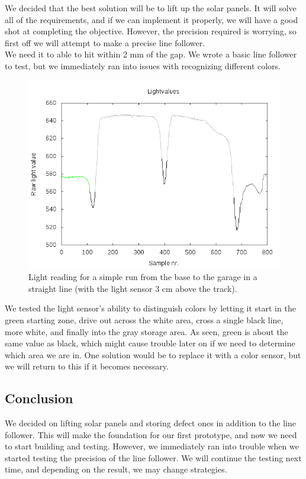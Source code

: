 We decided that the best solution will be to lift up the solar panels.
It will solve all of the requirements, and if we can implement it
properly, we will have a good shot at completing the objective. However,
the precision required is worrying, so first off we will attempt to
make a precise line follower.\\We need it to able to hit within 2 mm of
the gap. We wrote a basic line follower to test, but we immediately ran
into issues with recognizing different colors.\\
\begin{figure}[hpt]
  \centering
  \includegraphics[scale=0.5]{../experiments/1prototype/results/gnuplot/GridAccuracy3cm_color.png}
  \caption{Light reading for a simple run from the base to the garage in a straight line (with the light sensor 3 cm above the track).}
\end{figure}
We tested the light sensor's ability to distinguish colors by letting it
start in the green starting zone, drive out across the white area,
cross a single black line, more white, and finally into the gray
storage area. As seen, green is about the same value as black, which
might cause trouble later on if we need to determine which area we are
in. One solution would be to replace it with a color sensor, but we will
return to this if it becomes necessary.

\subsection{Conclusion}

We decided on lifting solar panels and storing defect ones in addition
to the line follower. This will make the foundation for our first
prototype, and now we need to start building and testing. However, we
immediately ran into trouble when we started testing the precision of
the line follower. We will continue the testing next time, and depending
on the result, we may change strategies.
